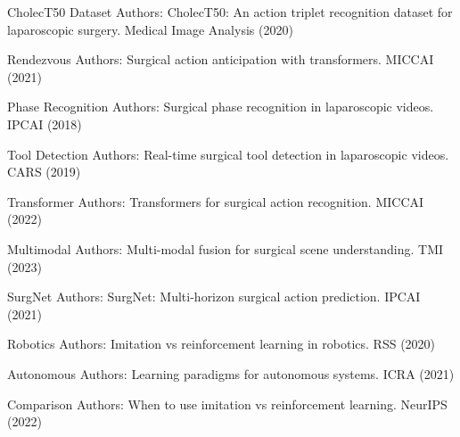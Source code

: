 \documentclass[runningheads]{llncs}
\begin{document}
\begin{thebibliography}{20}
CholecT50 Dataset Authors: CholecT50: An action triplet recognition dataset for laparoscopic surgery. Medical Image Analysis (2020)

Rendezvous Authors: Surgical action anticipation with transformers. MICCAI (2021)

Phase Recognition Authors: Surgical phase recognition in laparoscopic videos. IPCAI (2018)

Tool Detection Authors: Real-time surgical tool detection in laparoscopic videos. CARS (2019)

Transformer Authors: Transformers for surgical action recognition. MICCAI (2022)

Multimodal Authors: Multi-modal fusion for surgical scene understanding. TMI (2023)

SurgNet Authors: SurgNet: Multi-horizon surgical action prediction. IPCAI (2021)

Robotics Authors: Imitation vs reinforcement learning in robotics. RSS (2020)

Autonomous Authors: Learning paradigms for autonomous systems. ICRA (2021)

Comparison Authors: When to use imitation vs reinforcement learning. NeurIPS (2022)

\end{thebibliography}
\end{document}
